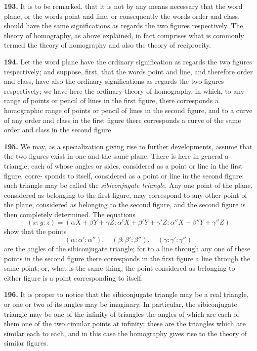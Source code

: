 \documentclass[11pt,a4paper]{book}
\begin{document}
\begin{center}
\textbf{193.} It is to be remarked, that it is not by any means necessary that the word
plane, or the words point and line, or consequently the words order and class, should
have the same significations as regards the two figures respectively. The theory of
homography, as above explained, in fact comprises what is commonly termed the theory
of homography and also the theory of reciprocity.

\textbf{194.} Let the word plane have the ordinary signification as regards the two figures
respectively; and suppose, first, that the words point and line, and therefore order
and class, have also the ordinary significations as regards the two figures respectively;
we have here the ordinary theory of homography, in which, to any range of points
or pencil of lines in the first figure, there corresponds a homographic range of points
or pencil of lines in the second figure, and to a curve of any order and class in the
first figure there corresponds a curve of the same order and class in the second figure.

\textbf{195.} We may, as a specialization giving rise to further developments, assume that
the two figures exist in one and the same plane. There is here in general a triangle,
each of whose angles or sides, considered as a point or line in the first figure, corre-
sponds to itself, considered as a point or line in the second figure: such triangle may
be called the \textit{sibiconjugate triangle}. Any one point of the plane, considered as belonging
to the first figure, may correspond to any other point of the plane, considered as
belonging to the second figure, and the second figure is then completely determined.
The equations
\[
(x:y:z) = (\alpha X+\beta Y+\gamma Z : \alpha' X+\beta' Y+\gamma' Z : \alpha'' X+\beta'' Y+\gamma'' Z)
\]
show that the points
\[
(\alpha:\alpha':\alpha''),\quad (\beta:\beta':\beta''),\quad (\gamma:\gamma':\gamma'')
\]
are the angles of the sibiconjugate triangle; for to a line through any one of these
points in the second figure there corresponds in the first figure a line through the same
point; or, what is the same thing, the point considered as belonging to either figure
is a point corresponding to itself.

\textbf{196.} It is proper to notice that the sibiconjugate triangle may be a real triangle,
or one or two of its angles may be imaginary. In particular, the sibiconjugate triangle
may be one of the infinity of triangles the angles of which are each of them one of the
two circular points at infinity; these are the triangles which are similar each to each,
and in this case the homography gives rise to the theory of similar figures.


\end{center}
\end{document}

